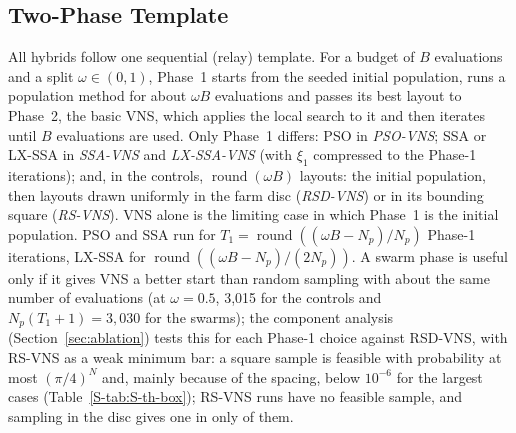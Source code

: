 \subsection{Two-Phase Template}
\label{sec:template}
All hybrids follow one sequential (relay) template. For a budget of $B$ evaluations and a split $\omega\in(0,1)$, Phase~1 starts from the seeded initial population, runs a population method for about $\omega B$ evaluations and passes its best layout to Phase~2, the basic VNS, which applies the local search to it and then iterates until $B$ evaluations are used. Only Phase~1 differs: PSO in \emph{PSO-VNS}; SSA or LX-SSA in \emph{SSA-VNS} and \emph{LX-SSA-VNS} (with $\xi_1$ compressed to the Phase-1 iterations); and, in the controls, $\operatorname{round}(\omega B)$ layouts: the initial population, then layouts drawn uniformly in the farm disc (\emph{RSD-VNS}) or in its bounding square (\emph{RS-VNS}). VNS alone is the limiting case in which Phase~1 is the initial population. PSO and SSA run for $T_1=\operatorname{round}((\omega B-N_p)/N_p)$ Phase-1 iterations, LX-SSA for $\operatorname{round}((\omega B-N_p)/(2N_p))$. A swarm phase is useful only if it gives VNS a better start than random sampling with about the same number of evaluations (at $\omega=0.5$, 3,015 for the controls and $N_p(T_1+1)=3{,}030$ for the swarms); the component analysis (Section~\ref{sec:ablation}) tests this for each Phase-1 choice against RSD-VNS, with RS-VNS as a weak minimum bar: a square sample is feasible with probability at most $(\pi/4)^N$ and, mainly because of the spacing, below $10^{-6}$ for the largest cases (Table~\ref{S-tab:S-th-box}); \NRSRunsNoFeasSample{} RS-VNS runs have no feasible sample, and sampling in the disc gives one in only \NRsSquareExplains{} of them.

